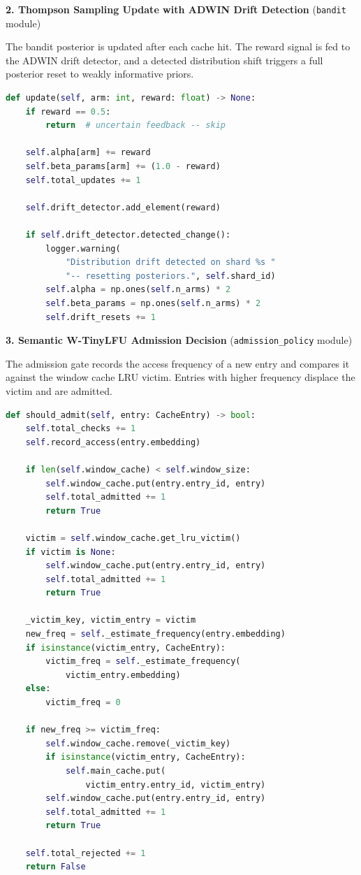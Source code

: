 \documentclass[12pt,a4paper]{report}
\begin{document}
\vspace{0.5cm}
\noindent\textbf{2. Thompson Sampling Update with ADWIN Drift Detection} (\texttt{bandit} module)

\noindent The bandit posterior is updated after each cache hit. The reward signal is fed to the ADWIN drift detector, and a detected distribution shift triggers a full posterior reset to weakly informative priors.

\begin{lstlisting}[language=Python]
def update(self, arm: int, reward: float) -> None:
    if reward == 0.5:
        return  # uncertain feedback -- skip

    self.alpha[arm] += reward
    self.beta_params[arm] += (1.0 - reward)
    self.total_updates += 1

    self.drift_detector.add_element(reward)

    if self.drift_detector.detected_change():
        logger.warning(
            "Distribution drift detected on shard %s "
            "-- resetting posteriors.", self.shard_id)
        self.alpha = np.ones(self.n_arms) * 2
        self.beta_params = np.ones(self.n_arms) * 2
        self.drift_resets += 1
\end{lstlisting}

\vspace{0.5cm}
\noindent\textbf{3. Semantic W-TinyLFU Admission Decision} (\texttt{admission\_policy} module)

\noindent The admission gate records the access frequency of a new entry and compares it against the window cache LRU victim. Entries with higher frequency displace the victim and are admitted.

\begin{lstlisting}[language=Python]
def should_admit(self, entry: CacheEntry) -> bool:
    self.total_checks += 1
    self.record_access(entry.embedding)

    if len(self.window_cache) < self.window_size:
        self.window_cache.put(entry.entry_id, entry)
        self.total_admitted += 1
        return True

    victim = self.window_cache.get_lru_victim()
    if victim is None:
        self.window_cache.put(entry.entry_id, entry)
        self.total_admitted += 1
        return True

    _victim_key, victim_entry = victim
    new_freq = self._estimate_frequency(entry.embedding)
    if isinstance(victim_entry, CacheEntry):
        victim_freq = self._estimate_frequency(
            victim_entry.embedding)
    else:
        victim_freq = 0

    if new_freq >= victim_freq:
        self.window_cache.remove(_victim_key)
        if isinstance(victim_entry, CacheEntry):
            self.main_cache.put(
                victim_entry.entry_id, victim_entry)
        self.window_cache.put(entry.entry_id, entry)
        self.total_admitted += 1
        return True

    self.total_rejected += 1
    return False
\end{lstlisting}
\end{document}
